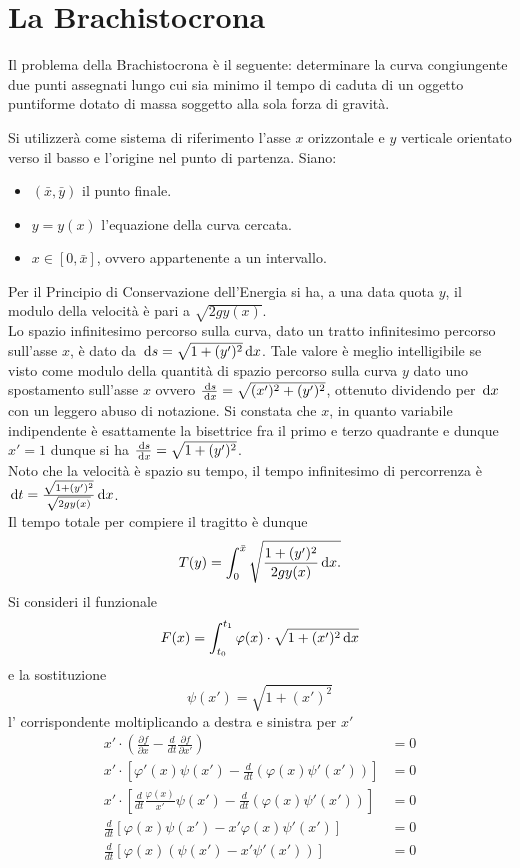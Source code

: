 \section{La Brachistocrona}
Il problema della Brachistocrona è il seguente: determinare la curva congiungente due punti assegnati lungo cui sia minimo il tempo di caduta
di un oggetto puntiforme dotato di massa soggetto alla sola forza di gravità.

Si utilizzerà come sistema di riferimento l'asse $x$ orizzontale e $y$ verticale orientato verso il basso e l'origine nel punto di partenza. Siano:
\begin{itemize}[noitemsep]
	\item $(\bar{x}, \bar{y})$ il punto finale.
	\item $ y = y(x) $ l'equazione della curva cercata.
	\item $ x \in \left[0, \bar{x}\right]$, ovvero appartenente a un intervallo.
\end{itemize}
Per il Principio di Conservazione dell'Energia si ha, a una data quota $y$, il modulo della velocità è pari a $ \sqrt{2gy(x)} $.\\
Lo spazio infinitesimo percorso sulla curva, dato un tratto infinitesimo percorso sull'asse $x$,
è dato da $ \,\mathrm{d}{s} = \sqrt{1 + (y')^2} \,\mathrm{d}{x} $.
Tale valore è meglio intelligibile se visto come modulo della quantità di spazio percorso sulla curva $y$ dato uno spostamento sull'asse $x$
ovvero $ \frac{\,\mathrm{d}{s}}{\,\mathrm{d}{x}} = \sqrt{(x')^2 + (y')^2} $, ottenuto dividendo per $\,\mathrm{d}{x} $ con un leggero abuso di notazione.
Si constata che $x$, in quanto variabile indipendente è esattamente la bisettrice fra il primo e terzo quadrante e dunque $ x' = 1 $
dunque si ha $ \frac{\,\mathrm{d}{s}}{\,\mathrm{d}{x}} = \sqrt{1 + (y')^2} $.\\
Noto che la velocità è spazio su tempo, il tempo infinitesimo di percorrenza è $ \,\mathrm{d}{t} = \frac{\sqrt{1 + (y')^2}}{\sqrt{2gy(x)}} \,\mathrm{d}{x} $.\\
Il tempo totale per compiere il tragitto è dunque
\[ T(y) = \int_0^{\bar{x}} \sqrt{\frac{1 + (y')^2}{2gy(x)} \,\mathrm{d}{x}.} \]
Si consideri il funzionale
\[ F(x) = \int_{t_0}^{t_1} \varphi(x) \cdot \sqrt{1 + (x')^2 \,\mathrm{d}{x}} \]
e la sostituzione
\[ \psi(x') = \sqrt{1 + (x')^2} \]
l' corrispondente moltiplicando a destra e sinistra per $x'$
\begin{align*}
	x' \cdot \left(\frac{\partial f}{\partial x} - \frac{d}{dt}\frac{\partial f}{\partial x'}\right) &= 0\\
	x' \cdot \left[\varphi'(x)\psi(x') - \frac{d}{dt}\left(\varphi(x)\psi'(x')\right)\right] &= 0\\
	x' \cdot \left[\frac{d}{dt}\frac{\varphi(x)}{x'}\psi(x') - \frac{d}{dt}\left(\varphi(x)\psi'(x')\right)\right] &= 0\\
	\frac{d}{dt}\left[ \varphi(x)\psi(x') - x'\varphi(x)\psi'(x') \right] &= 0\\
	\frac{d}{dt}\left[ \varphi(x)(\psi(x') - x'\psi'(x')) \right] &= 0
\end{align*}
